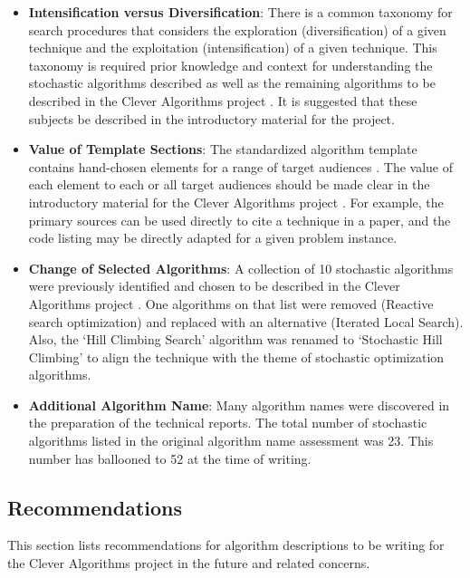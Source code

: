\documentclass[a4paper, 11pt]{article}
\begin{document}
\begin{itemize}
	\item \textbf{Intensification versus Diversification}: There is a common taxonomy for search procedures that considers the exploration (diversification) of a given technique and the exploitation (intensification) of a given technique. This taxonomy is required prior knowledge and context for understanding the stochastic algorithms described as well as the remaining algorithms to be described in the Clever Algorithms project \cite{Brownlee2010k}. It is suggested that these subjects be described in the introductory material for the project.
	\item \textbf{Value of Template Sections}: The standardized algorithm template contains hand-chosen elements for a range of target audiences \cite{Brownlee2010a}. The value of each element to each or all target audiences should be made clear in the introductory material for the Clever Algorithms project \cite{Brownlee2010k}. For example, the primary sources can be used directly to cite a technique in a paper, and the code listing may be directly adapted for a given problem instance.
	\item \textbf{Change of Selected Algorithms}: A collection of 10 stochastic algorithms were previously identified and chosen to be described in the Clever Algorithms project \cite{Brownlee2010b}. One algorithms on that list were removed (Reactive search optimization) and replaced with an alternative (Iterated Local Search). Also, the `Hill Climbing Search' algorithm was renamed to `Stochastic Hill Climbing' to align the technique with the theme of stochastic optimization algorithms.
	\item \textbf{Additional Algorithm Name}: Many algorithm names were discovered in the preparation of the technical reports. The total number of stochastic algorithms listed in the original algorithm name assessment was 23. This number has ballooned to 52 at the time of writing.
\end{itemize}


% 
% 
\subsection{Recommendations}
This section lists recommendations for algorithm descriptions to be writing for the Clever Algorithms project in the future and related concerns. 
\end{document}
